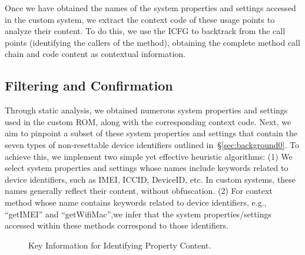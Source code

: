 Once we have obtained the names of the system properties and settings accessed in the custom system, we extract the context code of these usage points to analyze their content. 
To do this, we use the ICFG to backtrack from the call points (identifying the callers of the method), obtaining the complete method call chain and code content as contextual information.

\subsection{Filtering and Confirmation}
\label{sec:approachfilter}
Through static analysis, we obtained numerous system properties and settings used in the custom ROM, along with the corresponding context code.
Next, we aim to pinpoint a subset of these system properties and settings that contain the seven types of non-resettable device identifiers outlined in~\S\ref{sec:background0}.
To achieve this, we implement two simple yet effective heuristic algorithms: (1) We select system properties and settings whose names include keywords related to device identifiers, such as IMEI, ICCID, DeviceID, etc. 
In custom systems, these names generally reflect their content, without obfuscation.
(2) For context method whose name contains keywords related to device identifiers, e.g., ``getIMEI'' and ``getWifiMac'',we infer that the system properties/settings accessed within these methods correspond to those identifiers.


\begin{figure}[h]
  \centering
  \caption{Key Information for Identifying Property Content.}
  \label{fig:manuel}
\end{figure}

